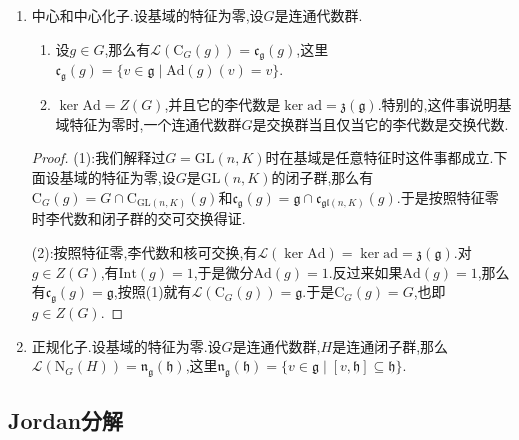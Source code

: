 \begin{enumerate}
\begin{proof}
    	充分性已经证明过了.必要性:设$\mathfrak{h}$是$\mathfrak{g}$的理想.记$N=\{g\in G\mid\mathrm{Ad}(g)(\mathfrak{h})=\mathfrak{h}\}$.那么有$\mathfrak{n}=\{v\in\mathfrak{g}\mid\mathrm{ad}(v)(\mathfrak{h})\subseteq\mathfrak{h}\}=\mathfrak{g}$,最后一个等号因为$\mathfrak{h}$是理想.于是有$N=G$.任取$g\in G$,就有$\mathscr{L}(\mathrm{Int}(g)(H))=\mathrm{Ad}(g)(\mathfrak{h})=\mathfrak{h}$.于是$H$和$gHg^{-1}$具有相同的李代数的连通闭子群,所以它们相同.
    \end{proof}
    \item 中心和中心化子.设基域的特征为零,设$G$是连通代数群.
    \begin{enumerate}[(1)]
    	\item 设$g\in G$,那么有$\mathscr{L}(\mathrm{C}_G(g))=\mathfrak{c}_{\mathfrak{g}}(g)$,这里$\mathfrak{c}_{\mathfrak{g}}(g)=\{v\in\mathfrak{g}\mid\mathrm{Ad}(g)(v)=v\}$.
    	\item $\ker\mathrm{Ad}=Z(G)$,并且它的李代数是$\ker\mathrm{ad}=\mathfrak{z}(\mathfrak{g})$.特别的,这件事说明基域特征为零时,一个连通代数群$G$是交换群当且仅当它的李代数是交换代数.
    \end{enumerate}
    \begin{proof}
    	
    	(1):我们解释过$G=\mathrm{GL}(n,K)$时在基域是任意特征时这件事都成立.下面设基域的特征为零,设$G$是$\mathrm{GL}(n,K)$的闭子群,那么有$\mathrm{C}_G(g)=G\cap\mathrm{C}_{\mathrm{GL}(n,K)}(g)$和$\mathfrak{c}_{\mathfrak{g}}(g)=\mathfrak{g}\cap\mathfrak{c}_{\mathfrak{gl}(n,K)}(g)$.于是按照特征零时李代数和闭子群的交可交换得证.
    	
    	\qquad
    	
    	(2):按照特征零,李代数和核可交换,有$\mathscr{L}(\ker\mathrm{Ad})=\ker\mathrm{ad}=\mathfrak{z}(\mathfrak{g})$.对$g\in Z(G)$,有$\mathrm{Int}(g)=1$,于是微分$\mathrm{Ad}(g)=1$.反过来如果$\mathrm{Ad}(g)=1$,那么有$\mathfrak{c}_{\mathfrak{g}}(g)=\mathfrak{g}$,按照(1)就有$\mathscr{L}(\mathrm{C}_G(g))=\mathfrak{g}$.于是$\mathrm{C}_G(g)=G$,也即$g\in Z(G)$.
    \end{proof}
    \item 正规化子.设基域的特征为零.设$G$是连通代数群,$H$是连通闭子群,那么$\mathscr{L}(\mathrm{N}_G(H))=\mathfrak{n}_{\mathfrak{g}}(\mathfrak{h})$,这里$\mathfrak{n}_{\mathfrak{g}}(\mathfrak{h})=\{v\in\mathfrak{g}\mid[v,\mathfrak{h}]\subseteq\mathfrak{h}\}$.
\end{enumerate}
\subsection{Jordan分解}

